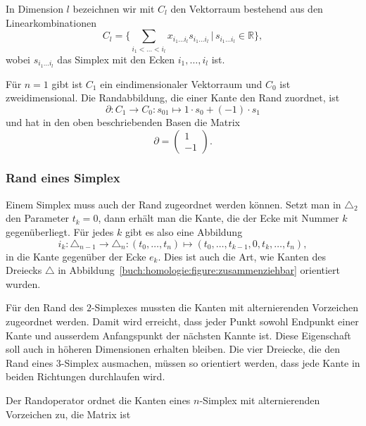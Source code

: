 In Dimension $l$ bezeichnen wir mit $C_l$  den Vektorraum bestehend
aus den Linearkombinationen
\[
C_l
=
\biggl\{
\sum_{i_1<\dots<i_l} x_{i_1\dots i_l} s_{i_1\dots i_l}
\,
\bigg|
\,
s_{i_1\dots i_l}\in\mathbb{R}
\biggr\},
\]
wobei $s_{i_1\dots i_l}$ das Simplex mit den Ecken $i_1,\dots,i_l$ ist.

Für $n=1$ gibt ist $C_1$ ein eindimensionaler Vektorraum und $C_0$
ist zweidimensional.
Die Randabbildung, die einer Kante den Rand zuordnet, ist
\[
\partial
\colon 
C_1\to C_0
:
s_{01}
\mapsto
1\cdot s_0 + (-1)\cdot s_1
\]
und hat in den oben beschriebenden Basen die Matrix
\[
\partial 
=
\begin{pmatrix}
1\\
-1
\end{pmatrix}.
\]

\subsubsection{Rand eines Simplex}
Einem Simplex muss auch der Rand zugeordnet werden können.
Setzt man in $\triangle_2$ den Parameter $t_k=0$, dann erhält
man die Kante,
die der Ecke mit Nummer $k$ gegenüberliegt.
Für jedes $k$ gibt es also eine Abbildung
\[
i_k
\colon
\triangle_{n-1} \to \triangle_n
:
(t_0,\dots,t_n)
\mapsto
(t_0,\dots,t_{k-1},0,t_{k},\dots,t_n),
\]
in die Kante gegenüber der Ecke $e_k$.
Dies ist auch die Art, wie Kanten des Dreiecks $\triangle$ 
in Abbildung~\ref{buch:homologie:figure:zusammenziehbar}
orientiert wurden.

Für den Rand des $2$-Simplexes mussten die Kanten mit alternierenden
Vorzeichen zugeordnet werden.
Damit wird erreicht, dass jeder Punkt sowohl Endpunkt einer 
Kante und
ausserdem Anfangspunkt der nächsten Kannte ist.
Diese Eigenschaft soll auch in höheren Dimensionen erhalten bleiben.
Die vier Dreiecke, die den Rand eines $3$-Simplex ausmachen,
müssen so orientiert werden,
dass jede Kante in beiden Richtungen durchlaufen wird.

\begin{definition}
\label{buch:def:randoperator}
Der Randoperator ordnet die Kanten eines $n$-Simplex mit alternierenden
Vorzeichen zu, die Matrix ist
\[
\]
\end{definition}

